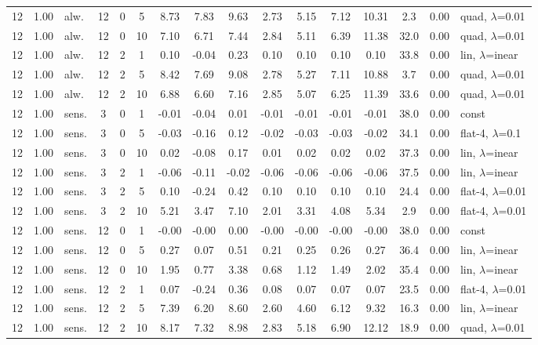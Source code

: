 \documentclass[10pt]{article}
\begin{document}
\begin{scriptsize}
\begin{longtable}{cclcc c ccc ccc c cc l}
12 & 1.00 & alw. & 12 & 0 & 5 & 8.73 & 7.83 & 9.63 & 2.73 & 5.15 & 7.12 & 10.31 & 2.3 & 0.00 & quad, $\lambda$=0.01 \\
12 & 1.00 & alw. & 12 & 0 & 10 & 7.10 & 6.71 & 7.44 & 2.84 & 5.11 & 6.39 & 11.38 & 32.0 & 0.00 & quad, $\lambda$=0.01 \\
12 & 1.00 & alw. & 12 & 2 & 1 & 0.10 & -0.04 & 0.23 & 0.10 & 0.10 & 0.10 & 0.10 & 33.8 & 0.00 & lin, $\lambda$=inear \\
12 & 1.00 & alw. & 12 & 2 & 5 & 8.42 & 7.69 & 9.08 & 2.78 & 5.27 & 7.11 & 10.88 & 3.7 & 0.00 & quad, $\lambda$=0.01 \\
12 & 1.00 & alw. & 12 & 2 & 10 & 6.88 & 6.60 & 7.16 & 2.85 & 5.07 & 6.25 & 11.39 & 33.6 & 0.00 & quad, $\lambda$=0.01 \\
12 & 1.00 & sens. & 3 & 0 & 1 & -0.01 & -0.04 & 0.01 & -0.01 & -0.01 & -0.01 & -0.01 & 38.0 & 0.00 & const \\
12 & 1.00 & sens. & 3 & 0 & 5 & -0.03 & -0.16 & 0.12 & -0.02 & -0.03 & -0.03 & -0.02 & 34.1 & 0.00 & flat-4, $\lambda$=0.1 \\
12 & 1.00 & sens. & 3 & 0 & 10 & 0.02 & -0.08 & 0.17 & 0.01 & 0.02 & 0.02 & 0.02 & 37.3 & 0.00 & lin, $\lambda$=inear \\
12 & 1.00 & sens. & 3 & 2 & 1 & -0.06 & -0.11 & -0.02 & -0.06 & -0.06 & -0.06 & -0.06 & 37.5 & 0.00 & lin, $\lambda$=inear \\
12 & 1.00 & sens. & 3 & 2 & 5 & 0.10 & -0.24 & 0.42 & 0.10 & 0.10 & 0.10 & 0.10 & 24.4 & 0.00 & flat-4, $\lambda$=0.01 \\
12 & 1.00 & sens. & 3 & 2 & 10 & 5.21 & 3.47 & 7.10 & 2.01 & 3.31 & 4.08 & 5.34 & 2.9 & 0.00 & flat-4, $\lambda$=0.01 \\
12 & 1.00 & sens. & 12 & 0 & 1 & -0.00 & -0.00 & 0.00 & -0.00 & -0.00 & -0.00 & -0.00 & 38.0 & 0.00 & const \\
12 & 1.00 & sens. & 12 & 0 & 5 & 0.27 & 0.07 & 0.51 & 0.21 & 0.25 & 0.26 & 0.27 & 36.4 & 0.00 & lin, $\lambda$=inear \\
12 & 1.00 & sens. & 12 & 0 & 10 & 1.95 & 0.77 & 3.38 & 0.68 & 1.12 & 1.49 & 2.02 & 35.4 & 0.00 & lin, $\lambda$=inear \\
12 & 1.00 & sens. & 12 & 2 & 1 & 0.07 & -0.24 & 0.36 & 0.08 & 0.07 & 0.07 & 0.07 & 23.5 & 0.00 & flat-4, $\lambda$=0.01 \\
12 & 1.00 & sens. & 12 & 2 & 5 & 7.39 & 6.20 & 8.60 & 2.60 & 4.60 & 6.12 & 9.32 & 16.3 & 0.00 & lin, $\lambda$=inear \\
12 & 1.00 & sens. & 12 & 2 & 10 & 8.17 & 7.32 & 8.98 & 2.83 & 5.18 & 6.90 & 12.12 & 18.9 & 0.00 & quad, $\lambda$=0.01 \\
\end{longtable}
\end{scriptsize}
\end{document}
